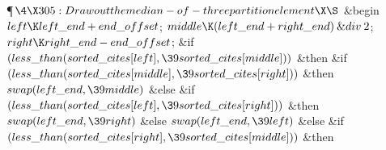 \Y\P$\4\X305:Draw out the median-of-three partition element\X\S$\6
\&{begin} $\\{left}\K\\{left\_end}+\\{end\_offset}$;\5
$\\{middle}\K(\\{left\_end}+\\{right\_end})\mathbin{\&{div}}2$;\5
$\\{right}\K\\{right\_end}-\\{end\_offset}$;\6
\&{if} $(\\{less\_than}(\\{sorted\_cites}[\\{left}],\39\\{sorted\_cites}[%
\\{middle}]))$ \1\&{then}\6
\&{if} $(\\{less\_than}(\\{sorted\_cites}[\\{middle}],\39\\{sorted\_cites}[%
\\{right}]))$ \1\&{then}\6
$\\{swap}(\\{left\_end},\39\\{middle})$\6
\4\&{else} \&{if} $(\\{less\_than}(\\{sorted\_cites}[\\{left}],\39\\{sorted%
\_cites}[\\{right}]))$ \1\&{then}\6
$\\{swap}(\\{left\_end},\39\\{right})$\6
\4\&{else} \2\2\2\6
$\\{swap}(\\{left\_end},\39\\{left})$\6
\4\&{else} \&{if} $(\\{less\_than}(\\{sorted\_cites}[\\{right}],\39\\{sorted%
\_cites}[\\{middle}]))$ \1\&{then}\6
